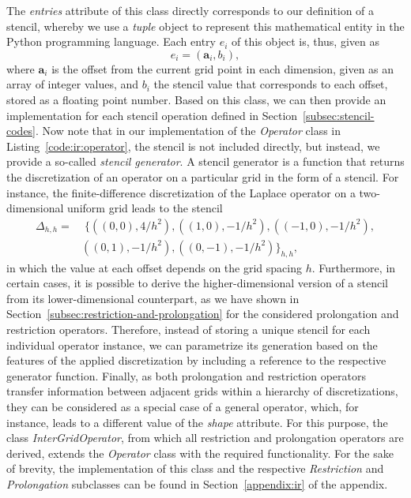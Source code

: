 The \emph{entries} attribute of this class directly corresponds to our definition of a stencil, whereby we use a \emph{tuple} object to represent this mathematical entity in the Python programming language.
Each entry $e_i$ of this object is, thus, given as
\begin{equation}
	e_i = \left(\bm{a}_i, b_i \right),
\end{equation} 
where $\bm{a}_i$ is the offset from the current grid point in each dimension, given as an array of integer values, and $b_i$ the stencil value that corresponds to each offset, stored as a floating point number.
Based on this class, we can then provide an implementation for each stencil operation defined in Section~\ref{subsec:stencil-codes}.
Now note that in our implementation of the \emph{Operator} class in Listing~\ref{code:ir:operator}, the stencil is not included directly, but instead, we provide a so-called \emph{stencil generator}.
A stencil generator is a function that returns the discretization of an operator on a particular grid in the form of a stencil.
For instance, the finite-difference discretization of the Laplace operator on a two-dimensional uniform grid leads to the stencil 
\begin{equation*}
	\begin{split}
		\Delta_{h,h} = & \; \big\{ \left( \left( 0,0 \right), 4 / h^2 \right), \left(\left(1,0\right), -1/h^2\right), \left(\left(-1,0\right), -1 / h^2\right), \\ & \left(\left(0,1\right), -1/h^2\right), \left(\left(0,-1\right), -1/h^2\right) \big\}_{h,h},
	\end{split}
\end{equation*}
in which the value at each offset depends on the grid spacing $h$.
Furthermore, in certain cases, it is possible to derive the higher-dimensional version of a stencil from its lower-dimensional counterpart, as we have shown in Section~\ref{subsec:restriction-and-prolongation} for the considered prolongation and restriction operators.
Therefore, instead of storing a unique stencil for each individual operator instance, we can parametrize its generation based on the features of the applied discretization by including a reference to the respective generator function.
Finally, as both prolongation and restriction operators transfer information between adjacent grids within a hierarchy of discretizations, they can be considered as a special case of a general operator, which, for instance, leads to a different value of the \emph{shape} attribute.
For this purpose, the class \emph{InterGridOperator}, from which all restriction and prolongation operators are derived, extends the \emph{Operator} class with the required functionality.
For the sake of brevity, the implementation of this class and the respective \emph{Restriction} and \emph{Prolongation} subclasses can be found in Section~\ref{appendix:ir} of the appendix.

